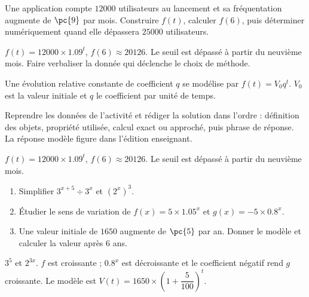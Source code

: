 \begin{activity}
Une application compte $\num{12000}$ utilisateurs au lancement et sa fréquentation augmente de $\pc{9}$ par mois. Construire $f(t)$, calculer $f(6)$, puis déterminer numériquement quand elle dépassera $\num{25000}$ utilisateurs.
\begin{center}\end{center}
\end{activity}
\begin{solution}$f(t)=\num{12000}\times\num{1,09}^t$, $f(6)\approx\num{20126}$. Le seuil est dépassé à partir du neuvième mois. Faire verbaliser la donnée qui déclenche le choix de méthode.\end{solution}

\begin{summary}Une évolution relative constante de coefficient $q$ se modélise par $f(t)=V_0q^t$. $V_0$ est la valeur initiale et $q$ le coefficient par unité de temps.\end{summary}

\begin{example}
Reprendre les données de l'activité et rédiger la solution dans l'ordre : définition des objets, propriété utilisée, calcul exact ou approché, puis phrase de réponse. La réponse modèle figure dans l'édition enseignant.
\end{example}
\begin{solution}$f(t)=\num{12000}\times\num{1,09}^t$, $f(6)\approx\num{20126}$. Le seuil est dépassé à partir du neuvième mois.\end{solution}

\begin{exercise}[essentiel]
\begin{enumerate}\item Simplifier $3^{x+5}\div3^x$ et $(2^x)^3$.\item Étudier le sens de variation de $f(x)=5\times\num{1,05}^x$ et $g(x)=-5\times\num{0,8}^x$.\item Une valeur initiale de $1650$ augmente de $\pc{5}$ par an. Donner le modèle et calculer la valeur après $6$ ans.\end{enumerate}
\end{exercise}
\begin{solution}$3^5$ et $2^{3x}$. $f$ est croissante ; $\num{0,8}^x$ est décroissante et le coefficient négatif rend $g$ croissante. Le modèle est $V(t)=1650\times\left(1+\dfrac{5}{100}\right)^t$.\end{solution}

